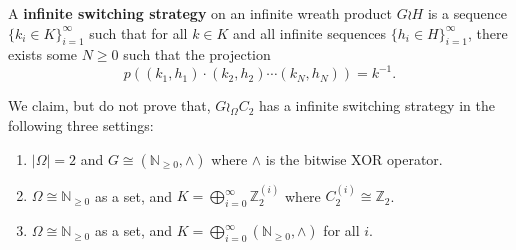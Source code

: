 \begin{definition}
  A \textbf{infinite switching strategy} on an infinite wreath product $G \wr H$
  is a sequence $\{k_i \in K\}_{i=1}^\infty$ such that for all $k \in K$ and
  all infinite sequences ${\{h_i \in H\}_{i=1}^\infty}$,
  there exists some $N \geq 0$ such that the projection \[
    p((k_1, h_1)\cdot(k_2, h_2)\cdots(k_N, h_N)) = k^{-1}.
  \]
\end{definition}

We claim, but do not prove that, $G \wr_\Omega C_2$ has a infinite switching
strategy in the following three settings: \begin{enumerate}
  \item $|\Omega| = 2$ and $G \cong (\mathbb N_{\geq 0}, \wedge)$ where $\wedge$ is the bitwise XOR operator.
  \item $\Omega \cong \mathbb N_{\geq 0}$ as a set, and $K = \bigoplus_{i=0}^\infty \mathbb Z_2^{(i)}$ where $C_2^{(i)} \cong \mathbb Z_2$.
  \item $\Omega \cong \mathbb N_{\geq 0}$ as a set, and $K = \bigoplus_{i=0}^\infty (\mathbb N_{\geq 0}, \wedge)$ for all $i$.
\end{enumerate}





